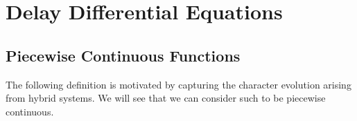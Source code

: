 \chapter{Delay Differential Equations}\label{sec:delay-differential-equations}

\section{Piecewise Continuous Functions}
    \label{sec:piecewise-continuous-functions}
    
    The following definition is motivated by capturing the character evolution arising from hybrid systems. We will see that we can consider such to be piecewise continuous.



